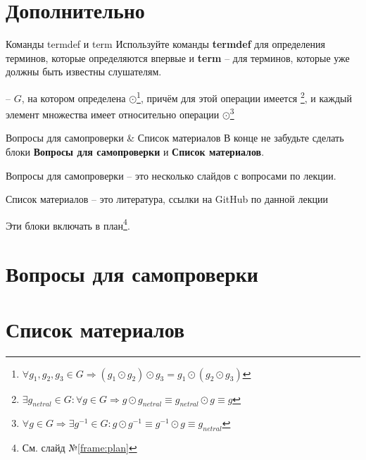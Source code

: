 \section{Дополнительно}\label{section:another}

\begin{frame}{Команды termdef и term}
Используйте команды \textbf{termdef} для определения терминов,
которые определяются впервые и \textbf{term} -- для терминов, которые
уже должны быть известны слушателям.

 --  
 $G$, 
на котором определена   $\odot$\footnote{
	$\forall g_1, g_2, g_3 \in G 
	\Rightarrow 
	(g_1 \odot g_2) \odot g_3 = 
	g_1 \odot (g_2 \odot g_3)$
}, 
причём для этой операции имеется \footnote{
	$\exists g_{netral} \in G: 
		\forall g \in G \Rightarrow 
			g  \odot g_{netral} \equiv 
			g_{netral}  \odot g \equiv g$
}, и каждый элемент множества имеет 
относительно операции $\odot$\footnote{
	$\forall g \in G \Rightarrow 
		\exists g^{-1} \in G: 
			g \odot g^{-1} \equiv 
			g^{-1} \odot g \equiv 
			g_{netral} $
}
\end{frame}

\begin{frame}{Вопросы для самопроверки \& Список материалов}
	В конце не забудьте сделать блоки 
	\textbf{Вопросы для самопроверки}
	и 
	\textbf{Список материалов}.
	
	Вопросы для самопроверки -- это несколько слайдов с вопросами по лекции.
	
	Список материалов -- это литература, ссылки на GitHub по данной лекции
	
	Эти блоки  включать в план\footnote{См. слайд №\ref{frame:plan}}.
\end{frame}


\section{Вопросы для самопроверки}


\section{Список материалов}


  
